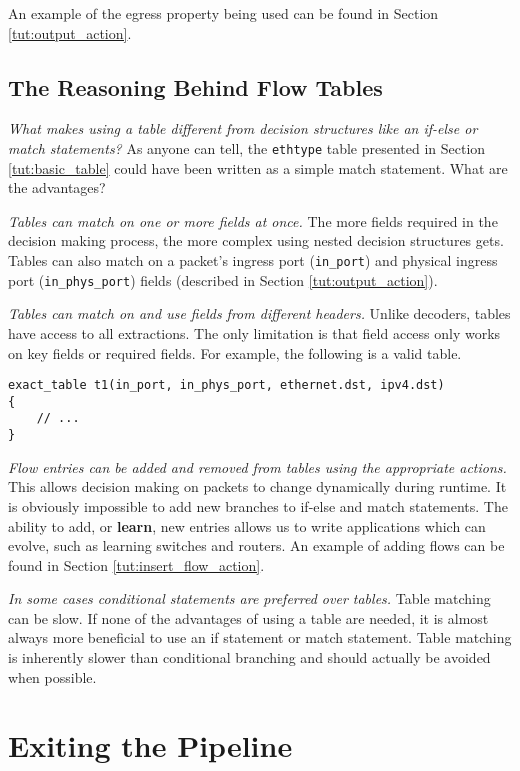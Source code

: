 An example of the egress property being used can be found in Section \ref{tut:output_action}.

\subsection{The Reasoning Behind Flow Tables} \label{tut:why_tables}

\textit{What makes using a table different from decision structures like an
if-else or match statements?} As anyone can tell, the \texttt{ethtype} table
presented in Section \ref{tut:basic_table} could have been written as a simple
match statement. What are the advantages?

\textit{Tables can match on one or more fields at once.} The more fields
required in the decision making process, the more complex using nested decision
structures gets. Tables can also match on a packet's ingress port
(\texttt{in\_port}) and physical ingress port (\texttt{in\_phys\_port}) fields
(described in Section \ref{tut:output_action}).

\textit{Tables can match on and use fields from different headers.} Unlike
decoders, tables have access to all extractions. The only limitation is that
field access only works on key fields or required fields. For example, the
following is a valid table.

\begin{lstlisting}
exact_table t1(in_port, in_phys_port, ethernet.dst, ipv4.dst)
{
	// ...
}
\end{lstlisting}

\textit{Flow entries can be added and removed from tables using the appropriate
actions.} This allows decision making on packets to change dynamically during
runtime. It is obviously impossible to add new branches to if-else and match
statements. The ability to add, or \textbf{learn}, new entries allows us to
write applications which can evolve, such as learning switches and routers. An
example of adding flows can be found in Section \ref{tut:insert_flow_action}.

\textit{In some cases conditional statements are preferred over tables.} Table matching can be slow. If none of the advantages of using a table are needed, it is almost always more beneficial to use an if statement or match statement. Table matching is inherently slower than conditional branching and should actually be avoided when possible.

\section{Exiting the Pipeline} \label{tut:pipeline_exit}


